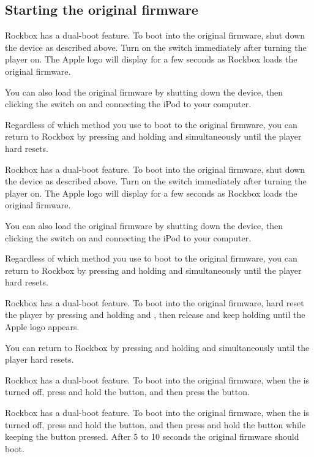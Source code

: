   {
  \subsection{Starting the original firmware}
  \label{ref:Dualboot}
    {
    Rockbox has a dual-boot feature. To boot into the original firmware, shut
    down the device as described above. Turn on the \ButtonHold{} switch
    immediately after turning the player on. The Apple logo will
    display for a few seconds as Rockbox loads the original firmware.

    You can also load the original firmware by shutting down the device,
    then clicking the \ButtonHold{} switch on and connecting the iPod
    to your computer.

    Regardless of which method you use to boot to the original firmware, you can
    return to Rockbox by pressing and holding \ButtonMenu{} and \ButtonSelect{}
    simultaneously until the player hard resets.
    }

    {
    Rockbox has a dual-boot feature. To boot into the original firmware, shut
    down the device as described above. Turn on the \ButtonHold{} switch
    immediately after turning the player on. The Apple logo will
    display for a few seconds as Rockbox loads the original firmware.

    You can also load the original firmware by shutting down the device,
    then clicking the \ButtonHold{} switch on and connecting the iPod
    to your computer.

    Regardless of which method you use to boot to the original firmware, you can
    return to Rockbox by pressing and holding \ButtonMenu{} and \ButtonPlay{}
    simultaneously until the player hard resets.
    }

    {
    Rockbox has a dual-boot feature. To boot into the original firmware, hard
    reset the player by pressing and holding \ButtonMenu{} and
    \ButtonSelect{}, then release \ButtonSelect{} and keep holding
    \ButtonMenu{} until the Apple logo appears.

    You can return to Rockbox by pressing and holding \ButtonMenu{} and
    \ButtonSelect{} simultaneously until the player hard resets.
    }

    {
    Rockbox has a dual-boot feature. To boot into the original firmware,
    when the \dap{} is turned off, press and hold the \ButtonRec{} button,
    and then press the \ButtonOn{} button.
    }
    {
    Rockbox has a dual-boot feature. To boot into the original firmware,
    when the \dap{} is turned off, press and hold the \ButtonVolDown{} button,
    and then press and hold the \ButtonPower{} button while keeping the
    \ButtonVolDown{} button pressed. After 5 to 10 seconds the original
    firmware should boot.

}}
